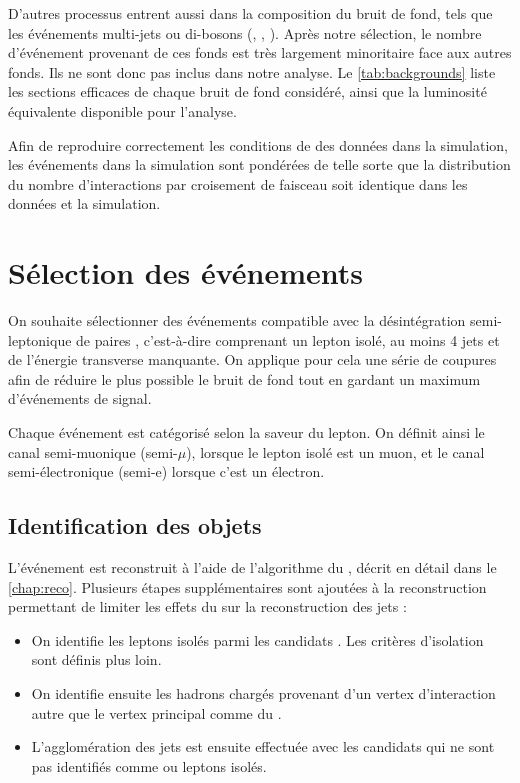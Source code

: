 D'autres processus entrent aussi dans la composition du bruit de fond, tels que les événements multi-jets ou di-bosons (\PW{}\PW, \PZ{}\PZ, \PW{}\PZ). Après notre sélection, le nombre d'événement provenant de ces fonds est très largement minoritaire face aux autres fonds. Ils ne sont donc pas inclus dans notre analyse. Le \cref{tab:backgrounds} liste les sections efficaces de chaque bruit de fond considéré, ainsi que la luminosité équivalente disponible pour l'analyse.

Afin de reproduire correctement les conditions de \pu des données dans la simulation, les événements dans la simulation sont pondérées de telle sorte que la distribution du nombre d'interactions par croisement de faisceau soit identique dans les données et la simulation.

\section{Sélection des événements}

On souhaite sélectionner des événements compatible avec la désintégration semi-leptonique de paires \ttbar, c'est-à-dire comprenant un lepton isolé, au moins 4 jets et de l'énergie transverse manquante. On applique pour cela une série de coupures afin de réduire le plus possible le bruit de fond tout en gardant un maximum d'événements de signal.

\medskip

Chaque événement est catégorisé selon la saveur du lepton. On définit ainsi le canal semi-muonique (semi-$\mu$), lorsque le lepton isolé est un muon, et le canal semi-électronique (semi-e) lorsque c'est un électron.

\subsection{Identification des objets}

L'événement est reconstruit à l'aide de l'algorithme du \pf, décrit en détail dans le \cref{chap:reco}. Plusieurs étapes supplémentaires sont ajoutées à la reconstruction permettant de limiter les effets du \pu sur la reconstruction des jets :
\begin{itemize}
    \item On identifie les leptons isolés parmi les candidats \pf. Les critères d'isolation sont définis plus loin.
    \item On identifie ensuite les hadrons chargés provenant d'un vertex d'interaction autre que le vertex principal comme du \pu.
    \item L'agglomération des jets est ensuite effectuée avec les candidats \pf qui ne sont pas identifiés comme \pu ou leptons isolés.
\end{itemize}

